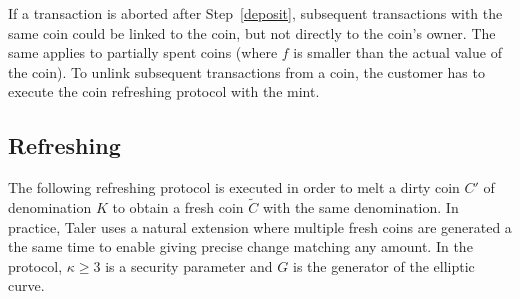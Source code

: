 \documentclass{llncs}
\begin{document}
If a transaction is aborted after Step~\ref{deposit},
subsequent transactions with the same coin could be linked to the coin,
but not directly to the coin's owner.  The same applies to partially
spent coins (where $f$ is smaller than the actual value of the coin).
To unlink subsequent transactions from a coin, the customer has to
execute the coin refreshing protocol with the mint.

%
%
%


\subsection{Refreshing} \label{sec:refreshing}

The following refreshing protocol is executed in order to melt a dirty
coin $C'$ of denomination $K$ to obtain a fresh coin $\widetilde{C}$
with the same denomination.  In practice, Taler uses a natural
extension where multiple fresh coins are generated a the same time to
enable giving precise change matching any amount.  In the
protocol, $\kappa \ge 3$ is a security parameter and $G$ is the
generator of the elliptic curve.
\end{document}
